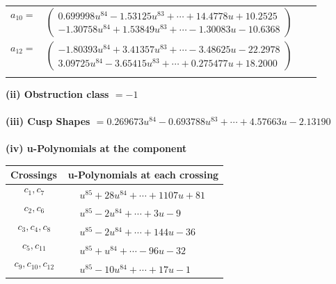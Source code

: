 \documentclass[1p]{elsarticle_modified}
\theoremstyle{definition}
\begin{document}
\begin{tabular}{m{7pt} m{180pt} m{7pt} m{180pt} }
\flushright $a_{10}=$&$\begin{pmatrix}0.699998 u^{84}-1.53125 u^{83}+\cdots+14.4778 u+10.2525\\-1.30758 u^{84}+1.53849 u^{83}+\cdots-1.30083 u-10.6368\end{pmatrix}$ \\
\flushright $a_{12}=$&$\begin{pmatrix}-1.80393 u^{84}+3.41357 u^{83}+\cdots-3.48625 u-22.2978\\3.09725 u^{84}-3.65415 u^{83}+\cdots+0.275477 u+18.2000\end{pmatrix}$\\&\end{tabular}
\flushleft \textbf{(ii) Obstruction class $= -1$}\\~\\
\flushleft \textbf{(iii) Cusp Shapes $= 0.269673 u^{84}-0.693788 u^{83}+\cdots+4.57663 u-2.13190$}\\~\\
\newpage\renewcommand{\arraystretch}{1}
\flushleft \textbf{(iv) u-Polynomials at the component}\newline \\
\begin{tabular}{m{50pt}|m{274pt}}
Crossings & \hspace{64pt}u-Polynomials at each crossing \\
\hline $$\begin{aligned}c_{1},c_{7}\end{aligned}$$&$\begin{aligned}
&u^{85}+28 u^{84}+\cdots+1107 u+81
\end{aligned}$\\
\hline $$\begin{aligned}c_{2},c_{6}\end{aligned}$$&$\begin{aligned}
&u^{85}-2 u^{84}+\cdots+3 u-9
\end{aligned}$\\
\hline $$\begin{aligned}c_{3},c_{4},c_{8}\end{aligned}$$&$\begin{aligned}
&u^{85}-2 u^{84}+\cdots+144 u-36
\end{aligned}$\\
\hline $$\begin{aligned}c_{5},c_{11}\end{aligned}$$&$\begin{aligned}
&u^{85}+u^{84}+\cdots-96 u-32
\end{aligned}$\\
\hline $$\begin{aligned}c_{9},c_{10},c_{12}\end{aligned}$$&$\begin{aligned}
&u^{85}-10 u^{84}+\cdots+17 u-1
\end{aligned}$\\
\hline
\end{tabular}\\~\\
\end{document}
